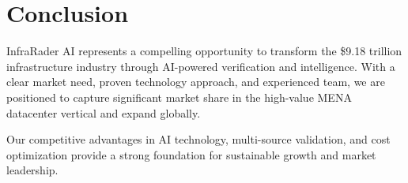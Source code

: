 \documentclass[business]{../templates/infraradar-main}
\begin{document}
\section{Conclusion}

InfraRader AI represents a compelling opportunity to transform the \$9.18 trillion infrastructure industry through AI-powered verification and intelligence. With a clear market need, proven technology approach, and experienced team, we are positioned to capture significant market share in the high-value MENA datacenter vertical and expand globally.

Our competitive advantages in AI technology, multi-source validation, and cost optimization provide a strong foundation for sustainable growth and market leadership.
\end{document}

